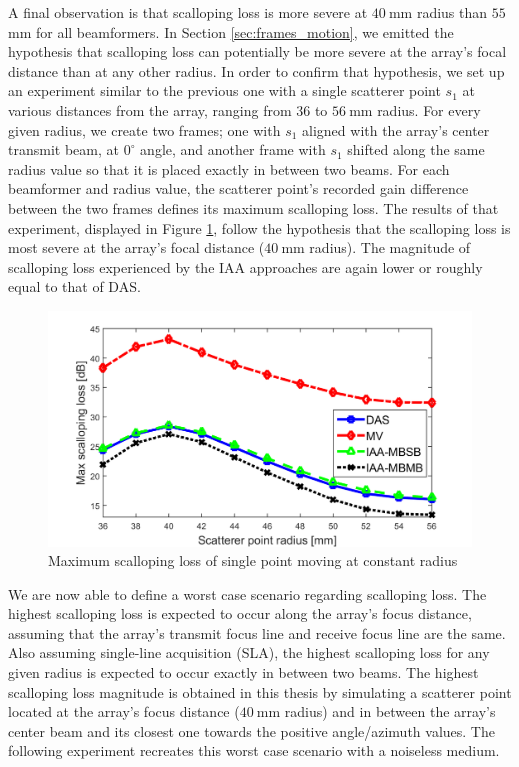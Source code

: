 A final observation is that scalloping loss is more severe at $40~$mm radius than $55~$mm for all beamformers. In Section \ref{sec:frames_motion}, we emitted the hypothesis that scalloping loss can potentially be more severe at the array's focal distance than at any other radius.
In order to confirm that hypothesis, we set up an experiment similar to the previous one with a single scatterer point $s_1$ at various distances from the array, ranging from $36$ to $56~$mm radius.
For every given radius, we create two frames; one with $s_1$ aligned with the array's center transmit beam, at $0^\circ$ angle, and another frame with $s_1$ shifted along the same radius value so that it is placed exactly in between two beams.
For each beamformer and radius value, the scatterer point's recorded gain difference between the two frames defines its maximum scalloping loss.
The results of that experiment, displayed in Figure \ref{fig:loss_vs_range}, follow the hypothesis that the scalloping loss is most severe at the array's focal distance ($40~$mm radius).
The magnitude of scalloping loss experienced by the IAA approaches are again lower or roughly equal to that of DAS.
\begin{figure}[ht]
    \centering
    \includegraphics[width=\linewidth]{./images/results/1/loss_vs_range.png}
	\caption{Maximum scalloping loss of single point moving at constant radius}
	\label{fig:loss_vs_range}
\end{figure}

We are now able to define a worst case scenario regarding scalloping loss. The highest scalloping loss is expected to occur along the array's focus distance, assuming that the array's transmit focus line and receive focus line are the same.
Also assuming single-line acquisition (SLA), the highest scalloping loss for any given radius is expected to occur exactly in between two beams.
The highest scalloping loss magnitude is obtained in this thesis by simulating a scatterer point located at the array's focus distance ($40~$mm radius) and in between the array's center beam and its closest one towards the positive angle/azimuth values.
The following experiment recreates this worst case scenario with a noiseless medium.

